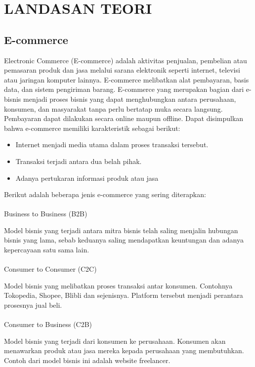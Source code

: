 \chapter{LANDASAN TEORI}
\section{E-commerce}
Electronic Commerce (E-commerce) adalah aktivitas penjualan, pembelian atau pemasaran produk dan jasa melalui sarana elektronik seperti internet, televisi atau jaringan komputer lainnya. E-commerce melibatkan alat pembayaran, basis data, dan sistem pengiriman barang. E-commerce yang merupakan bagian dari e-bisnis menjadi proses bisnis yang dapat menghubungkan antara perusahaan, konsumen, dan masyarakat tanpa perlu bertatap muka secara langsung. Pembayaran dapat dilakukan secara online maupun offline. Dapat disimpulkan bahwa e-commerce memiliki karakteristik sebagai berikut:
\begin{itemize}
	\item Internet menjadi media utama dalam proses transaksi tersebut.
	\item Transaksi terjadi antara dua belah pihak.
	\item Adanya pertukaran informasi produk atau jasa
\end{itemize}
\par Berikut adalah beberapa jenis e-commerce yang sering diterapkan: \\\\
Business to Business (B2B)\\
\par Model bisnis yang terjadi antara mitra bisnis telah saling menjalin hubungan bisnis yang lama, sebab keduanya saling mendapatkan keuntungan dan adanya kepercayaan satu sama lain. \\\\
Consumer to Consumer (C2C)\\
\par Model bisnis yang melibatkan proses transaksi antar konsumen. Contohnya Tokopedia, Shopee, Blibli dan sejenisnya. Platform tersebut menjadi perantara prosesnya jual beli. \\\\
Consumer to Business (C2B)\\
\par Model bisnis yang terjadi dari konsumen ke perusahaan. Konsumen akan menawarkan produk atau jasa mereka kepada perusahaan yang membutuhkan. Contoh dari model bisnis ini adalah website freelancer.\\

